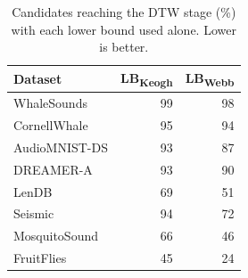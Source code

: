 \begin{table}[t]
\centering
\caption{Candidates reaching the DTW stage (\%) with each lower bound used alone. Lower is better.}
\label{tab:lower_bound_survival}
\small
\setlength{\tabcolsep}{12pt}
\begin{tabular}{@{}lrr@{}}
\toprule
Dataset & LB\textsubscript{Keogh} & LB\textsubscript{Webb} \\
\midrule
WhaleSounds & 99 & 98 \\
CornellWhale & 95 & 94 \\
AudioMNIST-DS & 93 & 87 \\
DREAMER-A & 93 & 90 \\
LenDB & 69 & 51 \\
Seismic & 94 & 72 \\
MosquitoSound & 66 & 46 \\
FruitFlies & 45 & 24 \\
\bottomrule
\end{tabular}
\end{table}
